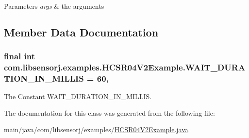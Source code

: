 \begin{DoxyParams}{Parameters}
{\em args} & the arguments \\
\hline
\end{DoxyParams}


\subsection{Member Data Documentation}
\hypertarget{classcom_1_1libsensorj_1_1examples_1_1HCSR04V2Example_a842da4140bea50803113aae3d885604d}{}
\subsubsection[{W\+A\+I\+T\+\_\+\+D\+U\+R\+A\+T\+I\+O\+N\+\_\+\+I\+N\+\_\+\+M\+I\+L\+L\+I\+S}]{\setlength{\rightskip}{0pt plus 5cm}final int com.\+libsensorj.\+examples.\+H\+C\+S\+R04\+V2\+Example.\+W\+A\+I\+T\+\_\+\+D\+U\+R\+A\+T\+I\+O\+N\+\_\+\+I\+N\+\_\+\+M\+I\+L\+L\+I\+S = 60\hspace{0.3cm}{\ttfamily [static]}, {\ttfamily [private]}}\label{classcom_1_1libsensorj_1_1examples_1_1HCSR04V2Example_a842da4140bea50803113aae3d885604d}
The Constant W\+A\+I\+T\+\_\+\+D\+U\+R\+A\+T\+I\+O\+N\+\_\+\+I\+N\+\_\+\+M\+I\+L\+L\+I\+S. 

The documentation for this class was generated from the following file\+:\begin{DoxyCompactItemize}
\item 
main/java/com/libsensorj/examples/\hyperlink{HCSR04V2Example_8java}{H\+C\+S\+R04\+V2\+Example.\+java}\end{DoxyCompactItemize}
